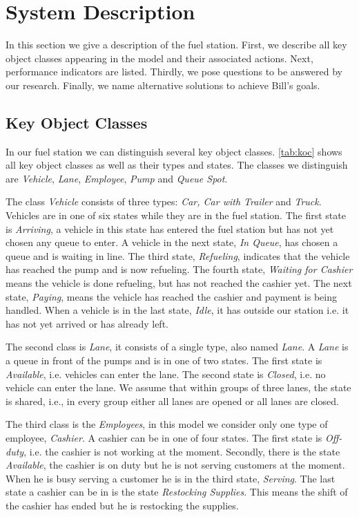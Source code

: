 \section{System Description}
In this section we give a description of the fuel station.
First, we describe all key object classes appearing in the model and their associated actions.
Next, performance indicators are listed.
Thirdly, we pose questions to be answered by our research.
Finally, we name alternative solutions to achieve Bill's goals.

\subsection{Key Object Classes}
In our fuel station we can distinguish several key object classes.
\autoref{tab:koc} shows all key object classes as well as their types and states.
The classes we distinguish are \textit{Vehicle}, \textit{Lane}, \textit{Employee}, \textit{Pump} and \textit{Queue Spot}.

The class \textit{Vehicle} consists of three types: \textit{Car, Car with Trailer} and \textit{Truck}.
 Vehicles are in one of six states while they are in the fuel station.
 The first state is \textit{Arriving}, a vehicle in this state has entered the fuel station but has not yet chosen any queue to enter.
 A vehicle in the next state, \textit{In Queue}, has chosen a queue and is waiting in line.
 The third state, \textit{Refueling}, indicates that the vehicle has reached the pump and is now refueling.
 The fourth state, \textit{Waiting for Cashier} means the vehicle is done refueling, but has not reached the cashier yet.
 The next state, \textit{Paying}, means the vehicle has reached the cashier and payment is being handled.
 When a vehicle is in the last state, \textit{Idle}, it has outside our station i.e. it has not yet arrived or has already left.

The second class is \textit{Lane}, it consists of a single type, also named \textit{Lane}.
A \textit{Lane} is a queue in front of the pumps and is in one of two states.
The first state is \textit{Available}, i.e. vehicles can enter the lane.
The second state is \textit{Closed}, i.e. no vehicle can enter the lane.
We assume that within groups of three lanes, the state is shared, i.e., in every group either all lanes are opened or all lanes are closed.

The third class is the \textit{Employees}, in this model we consider only one type of employee, \textit{Cashier}.
A cashier can be in one of four states.
The first state is \textit{Off-duty}, i.e. the cashier is not working at the moment.
Secondly, there is the state \textit{Available}, the cashier is on duty but he is not serving customers at the moment.
When he is busy serving a customer he is in the third state, \textit{Serving}.
The last state a cashier can be in is the state \textit{Restocking Supplies}.
This means the shift of the cashier has ended but he is restocking the supplies.

